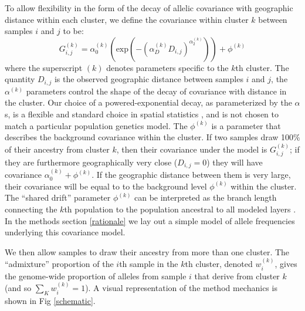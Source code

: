 \documentclass[12pt]{article}
\begin{document}
To allow flexibility in the form of the decay of allelic covariance with geographic distance within each cluster, 
we define the covariance within cluster $k$ between samples $i$ and $j$ to be:
\begin{equation}
G^{(k)}_{i,j} 
    = 
    \alpha^{(k)}_0 \left( \text{exp} \left( -(\alpha^{(k)}_D D_{i,j}) ^ {\alpha^{(k)}_2}	\right) \right) + \phi^{(k)}
\label{within_cluster_covariance}
\end{equation}
where the superscript $(k)$ denotes parameters specific to the $k$th cluster.
The quantity $D_{i,j}$ is the observed geographic distance between samples $i$ and $j$,
the $\alpha^{(k)}$ parameters control the shape of the decay of
covariance with distance in the cluster.
Our choice of a powered-exponential decay, 
as parameterized by the $\alpha$s, 
is a flexible and standard choice in spatial statistics \citep{Diggle1998}, 
and is not chosen to match a particular population genetics model. 
The $\phi^{(k)}$ is a parameter that describes the background covariance within the cluster. 
If two samples draw 100\% of their ancestry from cluster $k$, then their covariance under the model is $G^{(k)}_{i,j}$;
if they are furthermore geographically very close ($D_{i,j}=0$)
they will have covariance $\alpha^{(k)}_0 +  \phi^{(k)}$.
If the geographic distance between them is very large, 
their covariance will be equal to to the background level $\phi^{(k)}$ within the cluster.
The ``shared drift'' parameter $\phi^{(k)}$ can be interpreted as the branch length 
connecting the $k$th population to the population ancestral to all modeled
layers \citep[see for example ][]{patterson_ancient_2012,
  peter_fstats}. In the methods section \ref{rationale} we lay out a
simple model of allele frequencies underlying this covariance model.

We then allow samples to draw their ancestry from more than one cluster.
The ``admixture'' proportion of the $i$th sample in the $k$th cluster, denoted $w^{(k)}_i$,
gives the genome-wide proportion of alleles from sample $i$ that derive from
cluster $k$ (and so $\sum_K w^{(k)}_i =1$).
A visual representation of the method mechanics is shown in Fig \ref{schematic}.
\end{document}
